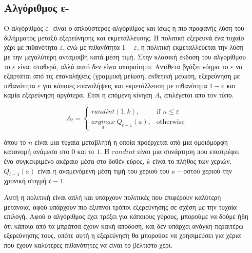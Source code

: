 \subsection{Αλγόριθμος ε-}

Ο αλγόριθμος $ε$- είναι ο απλούστερος αλγόριθμος και ίσως η πιο προφανής λύση του διλήμματος μεταξύ εξερεύνησης και εκμετάλλευσης. Η πολιτική εξερευνά ένα τυχαίο χέρι με πιθανότητα $ε$, ενώ με πιθανότητα $1-ε$, η πολιτική εκμεταλλεύεται την λύση με την μεγαλύτερη ανταμοιβή κατά μέση τιμή. Στην κλασική έκδοση του αλγορίθμου το $ε$ είναι σταθερά, αλλά αυτό δεν είναι απαραίτητο. Αντίθετα βγάζει νόημα το $ε$ να εξαρτάται από τις επαναλήψεις (γραμμική μείωση, εκθετική μείωση, εξερεύνηση με πιθανότητα $ε$ για κάποιες επαναλήψεις και εκμετάλλευση με πιθανότητα $1-ε$ και καμία εξερεύνηση αργότερα. Έτσι η επόμενη κίνηση $A_t$ επιλέγεται απο τον τύπο.

\begin{otherlanguage}{english}
    \begin{equation*}
        A_t = \begin{cases}
            randint(1,k),                     & \text{if } n \leq ε \\
            \underset{a}{argmax}\;Q_{t-1}(a), & \text{otherwise}
        \end{cases}
    \end{equation*}
\end{otherlanguage}

όπου το $n$ είναι μια τυχαία μεταβλητή η οποία προέρχεται από μια ομοιόμορφη κατανομή ανάμεσα στο $0$ και το $1$. Η $randint$ είναι μια συνάρτηση που επιστρέφει ένα συγκεκριμένο ακέραιο μέσα στο δοθέν εύρος, $k$ είναι το πλήθος των χεριών, $Q_{t-1}(a)$ είναι η αναμενόμενη μέση τιμή του χεριού του $a-$οστού χεριού την χρονική στιγμή $t-1$.

Αυτή η πολιτική είναι απλή και υπάρχουν πολιτικές που επιφέρουν καλύτερη μετάνοια, αφού υπάρχουν πιο έξυπνοι τρόποι εξερεύνησης σε σχέση με την τυχαία επιλογή. Αφού ο αλγόριθμος έχει τρέξει για κάποιους γύρους, μπορούμε να δούμε ήδη ότι κάποια από τα μπράτσα έχουν κακή απόδοση, και δεν υπάρχει ανάγκη περαιτέρω εξερεύνησης τους, οπότε αυτή η εξερεύνηση θα μπορούσε να χρησιμεύσει για χέρια που έχουν καλύτερες πιθανότητες να είναι το βέλτιστο χέρι.

\subsection{}

